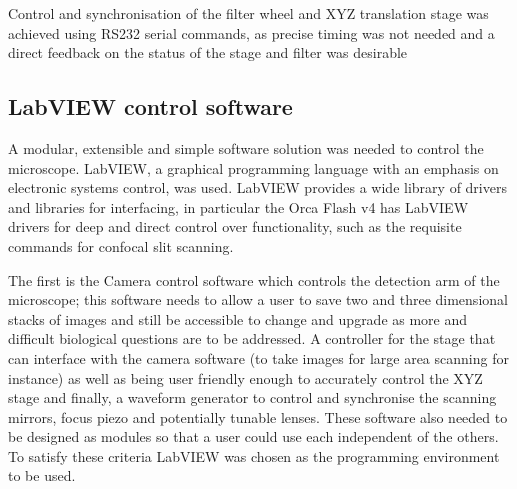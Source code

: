 Control and synchronisation of the filter wheel and XYZ translation stage was achieved using RS232 serial commands, as precise timing was not needed and a direct feedback on the status of the stage and filter was desirable %

%



\subsection{LabVIEW control software}

A modular, extensible and simple software solution was needed to control the microscope.
LabVIEW, a graphical programming language with an emphasis on electronic systems control, was used.
LabVIEW provides a wide library of drivers and libraries for interfacing, in particular the Orca Flash v4 has LabVIEW drivers for deep and direct control over functionality, such as the requisite commands for confocal slit scanning.



The first is the Camera control software which controls the detection arm of the microscope; this software needs to allow a user to save two and three dimensional stacks of images and still be accessible to change and upgrade as more and difficult biological questions are to be addressed.
A controller for the stage that can interface with the camera software (to take images for large area scanning for instance) as well as being user friendly enough to accurately control the XYZ stage and finally, a waveform generator to control and synchronise the scanning mirrors, focus piezo and potentially tunable lenses.
These software also needed to be designed as modules so that a user could use each independent of the others.
To satisfy these criteria LabVIEW was chosen as the programming environment to be used.

